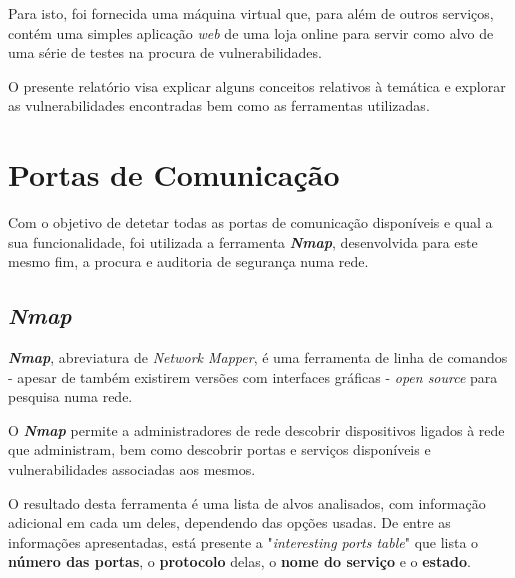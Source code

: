 \documentclass[10pt,english]{article}
\begin{document}
\par Para isto, foi fornecida uma máquina virtual que, para além de outros serviços, contém uma simples aplicação \textit{web} de uma loja online para servir como alvo de uma série de testes na procura de vulnerabilidades. 

\par O presente relatório visa explicar alguns conceitos relativos à temática e explorar as vulnerabilidades encontradas bem como as ferramentas utilizadas.
\clearpage

\section{Portas de Comunicação}
 \par Com o objetivo de detetar todas as portas de comunicação disponíveis e qual a sua funcionalidade, foi utilizada a ferramenta \textit{\textbf{Nmap}}, desenvolvida para este mesmo fim, a procura e auditoria de segurança numa rede.
 
 \subsection{\textit{Nmap}}
 \par \textit{\textbf{Nmap}}, abreviatura de \textit{Network Mapper}, é uma ferramenta de linha de comandos - apesar de também existirem versões com interfaces gráficas -  \textit{open source} para pesquisa numa rede.

\par O \textit{\textbf{Nmap}} permite a administradores de rede descobrir dispositivos ligados à rede que administram, bem como descobrir portas e serviços disponíveis e vulnerabilidades associadas aos mesmos.

\par O resultado desta ferramenta é uma lista de alvos analisados, com informação adicional em cada um deles, dependendo das opções usadas. De entre as informações apresentadas, está presente a "\textit{interesting ports table}" que lista o \textbf{número das portas}, o \textbf{protocolo} delas, o \textbf{nome do serviço} e o \textbf{estado}.
\end{document}

